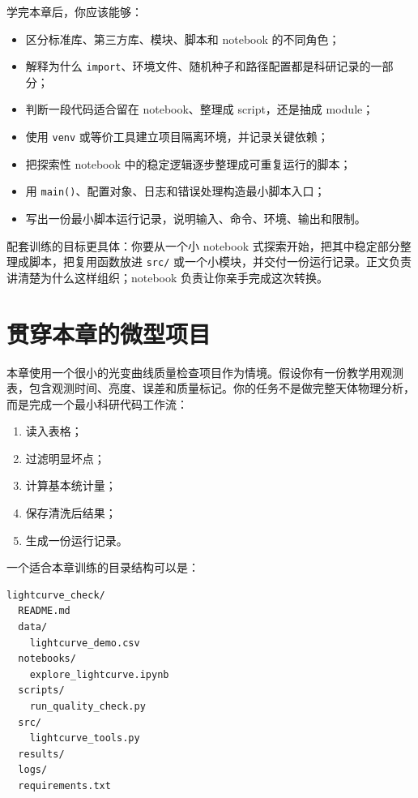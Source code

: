 学完本章后，你应该能够：

\begin{itemize}
    \item 区分标准库、第三方库、模块、脚本和 notebook 的不同角色；
    \item 解释为什么 \texttt{import}、环境文件、随机种子和路径配置都是科研记录的一部分；
    \item 判断一段代码适合留在 notebook、整理成 script，还是抽成 module；
    \item 使用 \texttt{venv} 或等价工具建立项目隔离环境，并记录关键依赖；
    \item 把探索性 notebook 中的稳定逻辑逐步整理成可重复运行的脚本；
    \item 用 \texttt{main()}、配置对象、日志和错误处理构造最小脚本入口；
    \item 写出一份最小脚本运行记录，说明输入、命令、环境、输出和限制。
\end{itemize}

配套训练的目标更具体：你要从一个小 notebook 式探索开始，把其中稳定部分整理成脚本，把复用函数放进 \texttt{src/} 或一个小模块，并交付一份运行记录。正文负责讲清楚为什么这样组织；notebook 负责让你亲手完成这次转换。

\section{贯穿本章的微型项目}

本章使用一个很小的光变曲线质量检查项目作为情境。假设你有一份教学用观测表，包含观测时间、亮度、误差和质量标记。你的任务不是做完整天体物理分析，而是完成一个最小科研代码工作流：

\begin{enumerate}
    \item 读入表格；
    \item 过滤明显坏点；
    \item 计算基本统计量；
    \item 保存清洗后结果；
    \item 生成一份运行记录。
\end{enumerate}

一个适合本章训练的目录结构可以是：

\begin{examplebox}
\begin{lstlisting}[style=terminal]
lightcurve_check/
  README.md
  data/
    lightcurve_demo.csv
  notebooks/
    explore_lightcurve.ipynb
  scripts/
    run_quality_check.py
  src/
    lightcurve_tools.py
  results/
  logs/
  requirements.txt
\end{lstlisting}
\end{examplebox}

